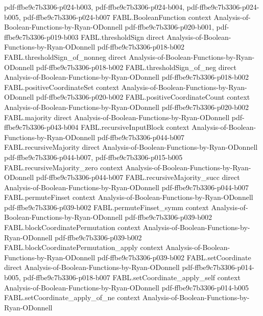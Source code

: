 \begin{theorem}
  {pdf-ffbe9c7b3306-p024-b003,
    pdf-ffbe9c7b3306-p024-b004,
    pdf-ffbe9c7b3306-p024-b005,
    pdf-ffbe9c7b3306-p024-b007}
\proofstep
  {FABL.BooleanFunction}
  {context}
  {Analysis-of-Boolean-Functions-by-Ryan-ODonnell}
  {pdf-ffbe9c7b3306-p020-b001,
    pdf-ffbe9c7b3306-p019-b003}
\proofstep
  {FABL.thresholdSign}
  {direct}
  {Analysis-of-Boolean-Functions-by-Ryan-ODonnell}
  {pdf-ffbe9c7b3306-p018-b002}
\proofstep
  {FABL.thresholdSign_of_nonneg}
  {direct}
  {Analysis-of-Boolean-Functions-by-Ryan-ODonnell}
  {pdf-ffbe9c7b3306-p018-b002}
\proofstep
  {FABL.thresholdSign_of_neg}
  {direct}
  {Analysis-of-Boolean-Functions-by-Ryan-ODonnell}
  {pdf-ffbe9c7b3306-p018-b002}
\proofstep
  {FABL.positiveCoordinateSet}
  {context}
  {Analysis-of-Boolean-Functions-by-Ryan-ODonnell}
  {pdf-ffbe9c7b3306-p020-b002}
\proofstep
  {FABL.positiveCoordinateCount}
  {context}
  {Analysis-of-Boolean-Functions-by-Ryan-ODonnell}
  {pdf-ffbe9c7b3306-p020-b002}
\proofstep
  {FABL.majority}
  {direct}
  {Analysis-of-Boolean-Functions-by-Ryan-ODonnell}
  {pdf-ffbe9c7b3306-p043-b004}
\proofstep
  {FABL.recursiveInputBlock}
  {context}
  {Analysis-of-Boolean-Functions-by-Ryan-ODonnell}
  {pdf-ffbe9c7b3306-p044-b007}
\proofstep
  {FABL.recursiveMajority}
  {direct}
  {Analysis-of-Boolean-Functions-by-Ryan-ODonnell}
  {pdf-ffbe9c7b3306-p044-b007,
    pdf-ffbe9c7b3306-p015-b005}
\proofstep
  {FABL.recursiveMajority_zero}
  {context}
  {Analysis-of-Boolean-Functions-by-Ryan-ODonnell}
  {pdf-ffbe9c7b3306-p044-b007}
\proofstep
  {FABL.recursiveMajority_succ}
  {direct}
  {Analysis-of-Boolean-Functions-by-Ryan-ODonnell}
  {pdf-ffbe9c7b3306-p044-b007}
\proofstep
  {FABL.permuteFinset}
  {context}
  {Analysis-of-Boolean-Functions-by-Ryan-ODonnell}
  {pdf-ffbe9c7b3306-p039-b002}
\proofstep
  {FABL.permuteFinset_symm}
  {context}
  {Analysis-of-Boolean-Functions-by-Ryan-ODonnell}
  {pdf-ffbe9c7b3306-p039-b002}
\proofstep
  {FABL.blockCoordinatePermutation}
  {context}
  {Analysis-of-Boolean-Functions-by-Ryan-ODonnell}
  {pdf-ffbe9c7b3306-p039-b002}
\proofstep
  {FABL.blockCoordinatePermutation_apply}
  {context}
  {Analysis-of-Boolean-Functions-by-Ryan-ODonnell}
  {pdf-ffbe9c7b3306-p039-b002}
\proofstep
  {FABL.setCoordinate}
  {direct}
  {Analysis-of-Boolean-Functions-by-Ryan-ODonnell}
  {pdf-ffbe9c7b3306-p014-b005,
    pdf-ffbe9c7b3306-p018-b007}
\proofstep
  {FABL.setCoordinate_apply_self}
  {context}
  {Analysis-of-Boolean-Functions-by-Ryan-ODonnell}
  {pdf-ffbe9c7b3306-p014-b005}
\proofstep
  {FABL.setCoordinate_apply_of_ne}
  {context}
  {Analysis-of-Boolean-Functions-by-Ryan-ODonnell}

\end{theorem}
